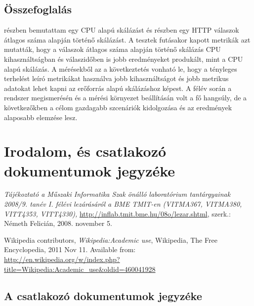 \documentclass[a4paper,oneside]{article}
\begin{document}
\subsection{Összefoglalás}
\label{sec:osszefoglalas}

 részben bemutattam egy CPU alapú skálázást és
 részben egy HTTP válaszok átlagos száma alapján
történő skálázást.  A tesztek futásakor kapott metrikák azt mutatták, hogy a
válaszok átlagos száma alapján történő skálázás CPU kihasználtságban és
válaszidőben is jobb eredményeket produkált, mint a CPU alapú skálázás.  A
mérésekből az a következtetés vonható le, hogy a tényleges terhelést leíró
metrikákat használva jobb kihasználtságot és jobb metrikus adatokat lehet kapni
az erőforrás alapú skálázáshoz képest.  A félév során a rendszer megismerésén és
a mérési környezet beállításán volt a fő hangsúly, de a következőkben a célom
gazdagabb szcenáriók kidolgozása és az eredmények alaposabb elemzése lesz.

\newpage
 
\section{Irodalom, és csatlakozó dokumentumok jegyzéke}
\label{sec:irod-es-csatl}

\begin{thebibliography}{9}
\label{sec:tanulm-irod-jegyz}

 \emph{Tájékoztató a Műszaki Informatika Szak önálló
    laboratórium tantárgyainak 2008/9. tanév I. félévi lezárásáról a
    BME TMIT-en (VITMA367, VITMA380, VITT4353, VITT4330),}
  \url{http://inflab.tmit.bme.hu/08o/lezar.shtml}, szerk.: Németh Felicián,
  2008. november 5.

 Wikipedia contributors, \emph{Wikipedia:Academic
    use}, Wikipedia, The Free Encyclopedia, 2011 Nov 11.  Available
  from: \\ \url{http://en.wikipedia.org/w/index.php?title=Wikipedia:Academic\_use\&oldid=460041928}

\end{thebibliography}

\subsection{A csatlakozó dokumentumok jegyzéke}
\label{sec:csat-irod}
\end{document}
